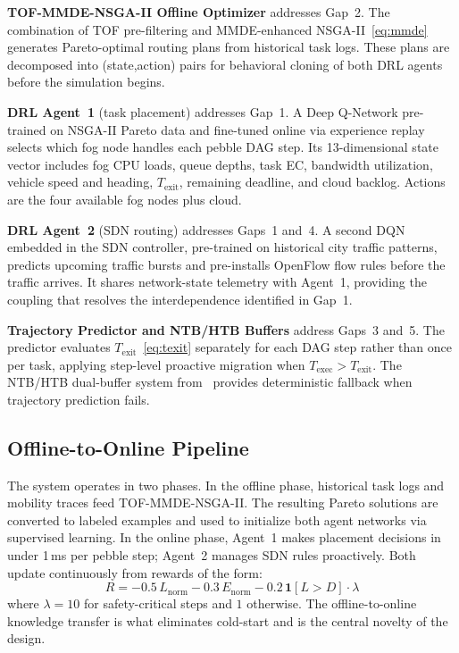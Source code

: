 \documentclass[12pt,a4paper]{article}
\begin{document}
\textbf{TOF-MMDE-NSGA-II Offline Optimizer} addresses Gap~2. The combination of
TOF pre-filtering and MMDE-enhanced NSGA-II~\eqref{eq:mmde} generates Pareto-optimal
routing plans from historical task logs. These plans are decomposed into
(state,\;action) pairs for behavioral cloning of both DRL agents before the
simulation begins.

\textbf{DRL Agent~1} (task placement) addresses Gap~1. A Deep Q-Network
pre-trained on NSGA-II Pareto data and fine-tuned online via experience replay
selects which fog node handles each pebble DAG step. Its 13-dimensional state
vector includes fog CPU loads, queue depths, task EC, bandwidth utilization,
vehicle speed and heading, $T_\mathrm{exit}$, remaining deadline, and cloud
backlog. Actions are the four available fog nodes plus cloud.

\textbf{DRL Agent~2} (SDN routing) addresses Gaps~1 and~4. A second DQN embedded
in the SDN controller, pre-trained on historical city traffic patterns, predicts
upcoming traffic bursts and pre-installs OpenFlow flow rules before the traffic
arrives. It shares network-state telemetry with Agent~1, providing the coupling
that resolves the interdependence identified in Gap~1.

\textbf{Trajectory Predictor and NTB/HTB Buffers} address Gaps~3 and~5. The
predictor evaluates $T_\mathrm{exit}$~\eqref{eq:texit} separately for each DAG
step rather than once per task, applying step-level proactive migration when
$T_\mathrm{exec} > T_\mathrm{exit}$. The NTB/HTB dual-buffer system from~\cite{paper5_mobility}
provides deterministic fallback when trajectory prediction fails.

\subsection{Offline-to-Online Pipeline}

The system operates in two phases. In the offline phase, historical task logs
and mobility traces feed TOF-MMDE-NSGA-II. The resulting Pareto solutions are
converted to labeled examples and used to initialize both agent networks via
supervised learning. In the online phase, Agent~1 makes placement decisions in
under 1\,ms per pebble step; Agent~2 manages SDN rules proactively. Both update
continuously from rewards of the form:
\begin{equation}
  R = -0.5\,L_\mathrm{norm} - 0.3\,E_\mathrm{norm}
    - 0.2\,\mathbf{1}[L > D]\cdot\lambda
\end{equation}
where $\lambda = 10$ for safety-critical steps and $1$ otherwise. The
offline-to-online knowledge transfer is what eliminates cold-start and is the
central novelty of the design.
\end{document}
